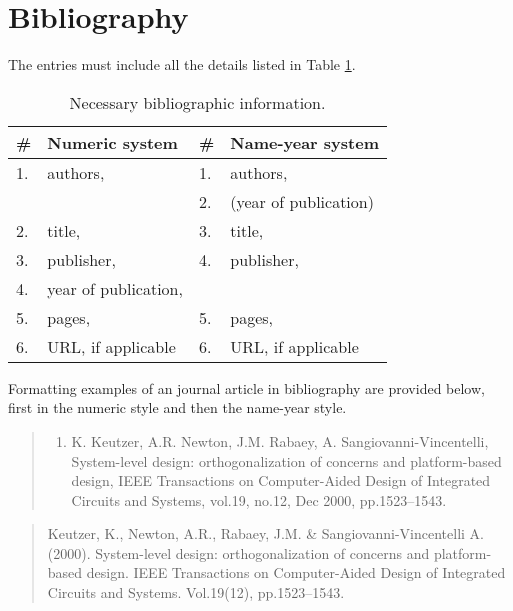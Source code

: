 \documentclass[twoside,draftfooter]{tutthesis} %
\begin{document}
\section{Bibliography}

The entries must include all the details listed in Table \ref{tab:bibliographic-information}.

\begin{table}[ht!]
\caption{Necessary bibliographic information.}
\label{tab:bibliographic-information}
\begin{tabular}{l l | l l}
\hline
\textbf{\#} & \textbf{Numeric system} & \# & \textbf{Name-year system} \\
\hline \hline
1. & authors, & 1. & authors,\\
& & 2. & (year of publication) \\
2. & title, & 3. & title, \\
3. & publisher, & 4. & publisher, \\
4. & year of publication, & \\
5. & pages, & 5. & pages, \\
6. & URL, if applicable & 6. & URL, if applicable \\
\hline
\end{tabular}
\end{table}

Formatting examples of an journal article in bibliography are provided below, first in the numeric style and then the name-year style.

\begin{quotation}
\small
\begin{enumerate}
  \renewcommand*\labelenumi{[\theenumi]}
  \setcounter{enumi}{99}
  \item K. Keutzer, A.R. Newton, J.M. Rabaey, A. Sangiovanni-Vincentelli, System-level design: orthogonalization of concerns and platform-based design, IEEE Transactions on Computer-Aided Design of Integrated Circuits and Systems, vol.19, no.12, Dec 2000, pp.1523--1543.
\end{enumerate}
\end{quotation}

\begin{quotation}
Keutzer, K., Newton, A.R., Rabaey, J.M. \& Sangiovanni-Vincentelli A. (2000). System-level design: orthogonalization of concerns and platform-based design. IEEE Transactions on Computer-Aided Design of Integrated Circuits and Systems. Vol.19(12), pp.1523--1543.
\end{quotation}
\end{document}
